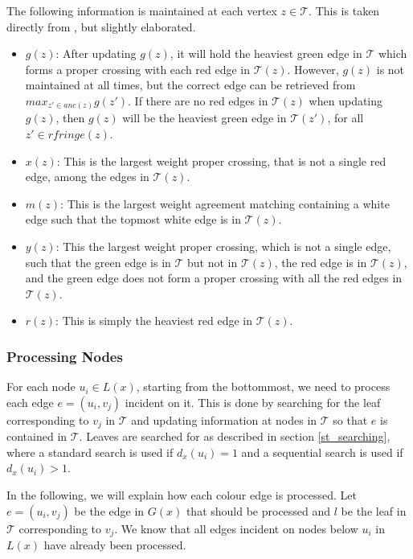 The following information is maintained at each vertex $z \in \mathcal{T}$. This is taken directly from \cite{nlogn}, but slightly elaborated.
\begin{itemize}
	\item $g(z)$: After updating $g(z)$, it will hold the heaviest green edge in $\mathcal{T}$ which	forms a proper crossing with each red edge in $\mathcal{T}(z)$.
	\subitem However, $g(z)$ is not maintained at all times, but the correct edge can be retrieved from $max_{z' \in anc(z)}g(z')$.
	\subitem If there are no red edges in $\mathcal{T}(z)$ when updating $g(z)$, then $g(z)$ will be the heaviest green edge in $\mathcal{T}(z')$, for all $z' \in rfringe(z)$.
	\item $x(z)$: This is the largest weight proper crossing, that is not a single red edge, among the edges in $\mathcal{T}(z)$.
	\item $m(z)$: This is the largest weight agreement matching containing a white edge
	such that the topmost white edge is in $\mathcal{T}(z)$.
	\item $y(z)$: This the largest weight proper crossing, which is not a single edge, such that the green edge is in $\mathcal{T}$ but not in $\mathcal{T}(z)$, the red edge is in $\mathcal{T}(z)$, and the green edge does not form a proper crossing with all the red edges in $\mathcal{T}(z)$.
	\item $r(z)$: This is simply the heaviest red edge in $\mathcal{T}(z)$.
\end{itemize}

\subsubsection{Processing Nodes}
For each node $u_i \in L(x)$, starting from the bottommost, we need to process each edge $e = (u_i, v_j)$ incident on it. This is done by searching for the leaf corresponding to $v_j$ in $\mathcal{T}$ and updating information at nodes in $\mathcal{T}$ so that $e$ is contained in $\mathcal{T}$. Leaves are searched for as described in section \ref{st_searching}, where a standard search is used if $d_x(u_i) = 1$ and a sequential search is used if $d_x(u_i) > 1$.

In the following, we will explain how each colour edge is processed. Let $e=(u_i,v_j)$ be the edge in $G(x)$ that should be processed and $l$ be the leaf in $\mathcal{T}$ corresponding to $v_j$. We know that all edges incident on nodes below $u_i$ in $L(x)$ have already been processed.

